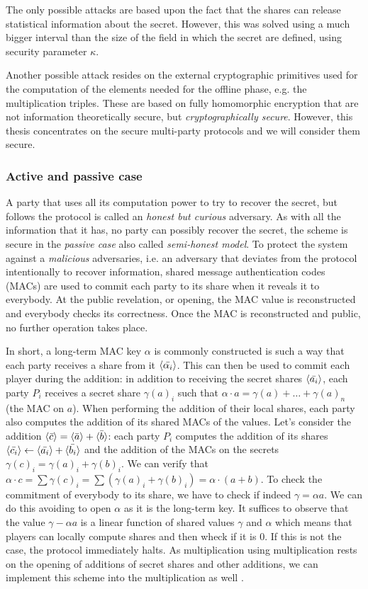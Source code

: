 The only possible attacks are based upon the fact that the shares can release statistical information about the secret. However, this was solved using a much bigger interval than the size of the field in which the secret are defined, using security parameter $\kappa$.

Another possible attack resides on the external cryptographic primitives used for the computation of the elements needed for the offline phase, e.g. the multiplication triples. These are based on fully homomorphic encryption that are not information theoretically secure, but \emph{cryptographically secure}. However, this thesis concentrates on the secure multi-party protocols and we will consider them secure.

\subsubsection{Active and passive case}
A party that uses all its computation power to try to recover the secret, but follows the protocol is called an \emph{honest but curious} adversary. As with all the information that it has, no party can possibly recover the secret, the scheme is secure in the \emph{passive case} also called \emph{semi-honest model}. To protect the system against a \emph{malicious} adversaries, i.e. an adversary that deviates from the protocol intentionally to recover information, shared message authentication codes (MACs) are used to commit each party to its share when it reveals it to everybody. At the public revelation, or opening, the MAC value is reconstructed and everybody checks its correctness. Once the MAC is reconstructed and public, no further operation takes place.

In short, a long-term MAC key $\alpha$ is commonly constructed is such a way that each party receives a share from it $\langle \bar{\alpha_i} \rangle$. This can then be used to commit each player during the addition: in addition to receiving the secret shares $\langle \bar{a_i} \rangle$, each party $P_i$ receives a secret share $\gamma(a)_i$ such that $\alpha \cdot a = \gamma(a) + \ldots + \gamma(a)_n$ (the MAC on $a$). When performing the addition of their local shares, each party also computes the addition of its shared MACs of the values. Let's consider the addition $\langle \bar{c} \rangle = \langle \bar{a} \rangle + \langle \bar{b} \rangle$: each party $P_i$ computes the addition of its shares $\langle \bar{c_i} \rangle \leftarrow \langle \bar{a_i} \rangle + \langle \bar{b_i} \rangle$ and the addition of the MACs on the secrets $\gamma(c)_i = \gamma(a)_i + \gamma(b)_i$. We can verify that $\alpha \cdot c = \sum \gamma(c)_i = \sum(\gamma(a)_i + \gamma(b)_i) = \alpha \cdot (a + b)$. To check the commitment of everybody to its share, we have to check if indeed $\gamma= \alpha a$. We can do this avoiding to open $\alpha$ as it is the long-term key. It suffices to observe that the value $\gamma - \alpha a$ is a linear function of shared values $\gamma$ and $\alpha$ which means that players can locally compute shares and then wheck if it is 0. If this is not the case, the protocol immediately halts. As multiplication using multiplication rests on the opening of additions of secret shares and other additions, we can implement this scheme into the multiplication as well \cite{Damgard2012PracticalLimits.}.

